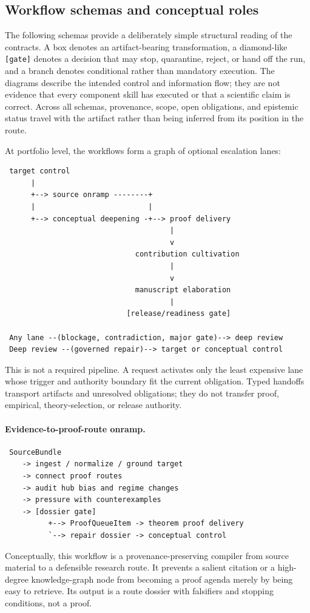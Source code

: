\documentclass[11pt]{article}
\begin{document}
\subsection{Workflow schemas and conceptual roles}

The following schemas provide a deliberately simple structural reading of the
contracts.  A box denotes an artifact-bearing transformation, a diamond-like
\texttt{[gate]} denotes a decision that may stop, quarantine, reject, or hand
off the run, and a branch denotes conditional rather than mandatory execution.
The diagrams describe the intended control and information flow; they are not
evidence that every component skill has executed or that a scientific claim is
correct.  Across all schemas, provenance, scope, open obligations, and
epistemic status travel with the artifact rather than being inferred from its
position in the route.

At portfolio level, the workflows form a graph of optional escalation lanes:
\begin{verbatim}
 target control
      |
      +--> source onramp --------+
      |                          |
      +--> conceptual deepening -+--> proof delivery
                                      |
                                      v
                              contribution cultivation
                                      |
                                      v
                              manuscript elaboration
                                      |
                            [release/readiness gate]

 Any lane --(blockage, contradiction, major gate)--> deep review
 Deep review --(governed repair)--> target or conceptual control
\end{verbatim}
This is not a required pipeline.  A request activates only the least expensive
lane whose trigger and authority boundary fit the current obligation.  Typed
handoffs transport artifacts and unresolved obligations; they do not transfer
proof, empirical, theory-selection, or release authority.

\paragraph{Evidence-to-proof-route onramp.}
\begin{verbatim}
 SourceBundle
    -> ingest / normalize / ground target
    -> connect proof routes
    -> audit hub bias and regime changes
    -> pressure with counterexamples
    -> [dossier gate]
          +--> ProofQueueItem -> theorem proof delivery
          `--> repair dossier -> conceptual control
\end{verbatim}
Conceptually, this workflow is a provenance-preserving compiler from source
material to a defensible research route.  It prevents a salient citation or a
high-degree knowledge-graph node from becoming a proof agenda merely by being
easy to retrieve.  Its output is a route dossier with falsifiers and stopping
conditions, not a proof.
\end{document}
